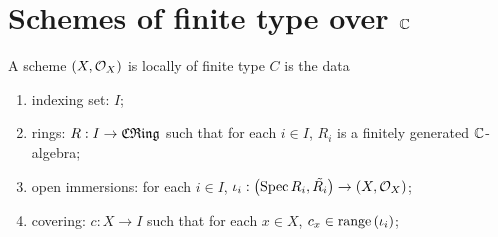 \chapter{Schemes of finite type over $\mathbb{C}$}

\begin{definition}
    A scheme $(X, \mathcal{O}_{X})$ is locally of finite type $C$ is the 
    data
    \begin{enumerate}
        \item indexing set: $I$;
        \item rings: $R : I \to \mathfrak{CRing}$ such that for each $i \in I$, $R_i$ is a finitely generated $\mathbb{C}$-algebra;
        \item open immersions: for each $i \in I$, $\iota_i: \left(\operatorname*{Spec}{R_i}, \tilde{R_i}\right) \to (X, \mathcal{O}_{X})$;
        \item covering: $c : X \to I$ such that for each $x \in X$, $c_x \in \operatorname*{range}\left({\iota_i}\right)$;
    \end{enumerate}
\end{definition}